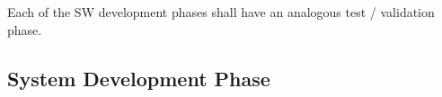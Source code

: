 Each of the SW development phases shall have an analogous test / validation
phase.

\subsection{System Development Phase}
\label{sec:syst-devel-phase}




